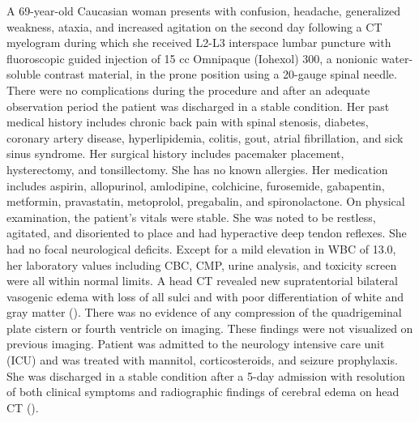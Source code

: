 A 69-year-old Caucasian woman presents with confusion, headache, generalized weakness, ataxia, and increased agitation on the second day following a CT myelogram during which she received L2-L3 interspace lumbar puncture with fluoroscopic guided injection of 15 cc Omnipaque (Iohexol) 300, a nonionic water-soluble contrast material, in the prone position using a 20-gauge spinal needle. There were no complications during the procedure and after an adequate observation period the patient was discharged in a stable condition.
Her past medical history includes chronic back pain with spinal stenosis, diabetes, coronary artery disease, hyperlipidemia, colitis, gout, atrial fibrillation, and sick sinus syndrome. Her surgical history includes pacemaker placement, hysterectomy, and tonsillectomy. She has no known allergies. Her medication includes aspirin, allopurinol, amlodipine, colchicine, furosemide, gabapentin, metformin, pravastatin, metoprolol, pregabalin, and spironolactone.
On physical examination, the patient's vitals were stable. She was noted to be restless, agitated, and disoriented to place and had hyperactive deep tendon reflexes. She had no focal neurological deficits. Except for a mild elevation in WBC of 13.0, her laboratory values including CBC, CMP, urine analysis, and toxicity screen were all within normal limits.
A head CT revealed new supratentorial bilateral vasogenic edema with loss of all sulci and with poor differentiation of white and gray matter (). There was no evidence of any compression of the quadrigeminal plate cistern or fourth ventricle on imaging. These findings were not visualized on previous imaging. Patient was admitted to the neurology intensive care unit (ICU) and was treated with mannitol, corticosteroids, and seizure prophylaxis. She was discharged in a stable condition after a 5-day admission with resolution of both clinical symptoms and radiographic findings of cerebral edema on head CT ().